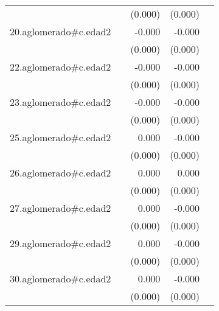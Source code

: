 {\begin{longtable}{l*{4}{D{.}{.}{-1}}}
            &                     &     (0.000)         &     (0.000)         &                     \\
\addlinespace
20.aglomerado#c.edad2&                     &      -0.000         &      -0.000         &                     \\
            &                     &     (0.000)         &     (0.000)         &                     \\
\addlinespace
22.aglomerado#c.edad2&                     &      -0.000         &      -0.000         &                     \\
            &                     &     (0.000)         &     (0.000)         &                     \\
\addlinespace
23.aglomerado#c.edad2&                     &      -0.000         &      -0.000         &                     \\
            &                     &     (0.000)         &     (0.000)         &                     \\
\addlinespace
25.aglomerado#c.edad2&                     &       0.000         &      -0.000         &                     \\
            &                     &     (0.000)         &     (0.000)         &                     \\
\addlinespace
26.aglomerado#c.edad2&                     &       0.000         &       0.000         &                     \\
            &                     &     (0.000)         &     (0.000)         &                     \\
\addlinespace
27.aglomerado#c.edad2&                     &       0.000         &      -0.000         &                     \\
            &                     &     (0.000)         &     (0.000)         &                     \\
\addlinespace
29.aglomerado#c.edad2&                     &       0.000         &      -0.000         &                     \\
            &                     &     (0.000)         &     (0.000)         &                     \\
\addlinespace
30.aglomerado#c.edad2&                     &       0.000         &      -0.000         &                     \\
            &                     &     (0.000)         &     (0.000)         &                     \\

\end{longtable}}
